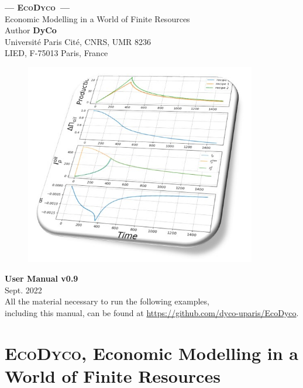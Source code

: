 \documentclass[12pt,a4paper]{article}%
\date{}
\newcommand{\ed}{\textsc{EcoDyco}}
\begin{document}
\begin{titlepage}

	\centering
		{\Huge \textbf{--- \ed\ ---} \\[0pt]}
		{\Large Economic Modelling in a World of Finite Resources \\[1cm]}
		\Large Author \textbf{DyCo} \\ 
		\large Universit\'e Paris Cit\'e, CNRS, UMR 8236 \\
		 LIED, F-75013 Paris, France
		\vspace{1cm}

		\begin{figure}[h]
			\centering \includegraphics[width=0.9\textwidth]{figures/couverture.jpg}
		\end{figure}
	
		\vspace{1cm}
		{\Huge \textbf{User Manual v0.9} \\[0.5cm]}
		{\Large Sept. 2022 \\[0.5cm]}
		{\large All the material necessary to run the following examples,\\ including this manual, can be found at \url{https://github.com/dyco-uparis/EcoDyco}. 
		}

\end{titlepage}
\restoregeometry

\tableofcontents
\setcounter{page}{1}

\newpage


\section{\ed, Economic Modelling in a World of Finite Resources}
\end{document}
